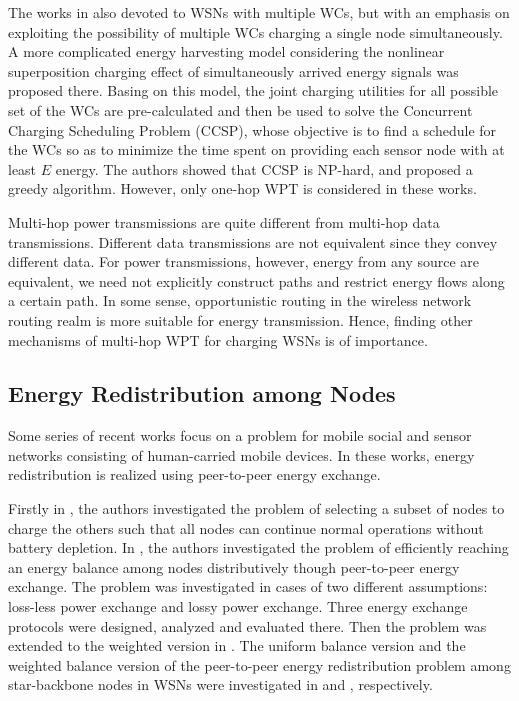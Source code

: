 \documentclass[12pt,journal,onecolumn,draftcls]{IEEEtran}
\begin{document}
The works in \cite{Guo2017,Guo2016} also devoted to WSNs with multiple WCs, but with an emphasis on exploiting the possibility of multiple WCs charging a single node simultaneously. A more complicated energy harvesting model considering the nonlinear superposition charging effect of simultaneously arrived energy signals was proposed there. Basing on this model, the joint charging utilities for all possible set of the WCs are pre-calculated and then be used to solve the Concurrent Charging Scheduling Problem (CCSP), whose objective is to find a schedule for the WCs so as to minimize the time spent on providing each sensor node with at least $E$ energy. The authors showed that CCSP is NP-hard, and proposed a greedy algorithm. However, only one-hop WPT is considered in these works.

Multi-hop power transmissions are quite different from multi-hop data transmissions. Different data transmissions are not equivalent since they convey different data. For power transmissions, however, energy from any source are equivalent, we need not explicitly construct paths and restrict energy flows along a certain path. In some sense, opportunistic routing in the wireless network routing realm is more suitable for energy transmission. Hence, finding other mechanisms of multi-hop WPT for charging WSNs is of importance.

\subsection{Energy Redistribution among Nodes}

Some series of recent works \cite{Bulut2014,Niko2016,Niko2017,Madhja2016,Madhja2017} focus on a problem for mobile social and sensor networks consisting of human-carried mobile devices. In these works, energy redistribution is realized using peer-to-peer energy exchange.

Firstly in \cite{Bulut2014}, the authors investigated the problem of selecting a subset of nodes to charge the others such that all nodes can continue normal operations without battery depletion. In \cite{Niko2016}, the authors investigated the problem of efficiently reaching an energy balance among nodes distributively though peer-to-peer energy exchange. The problem was investigated in cases of two different assumptions: loss-less power exchange and lossy power exchange. Three energy exchange protocols were designed, analyzed and evaluated there. Then the problem was extended to the weighted version in \cite{Niko2017}. The uniform balance version and the weighted balance version of the peer-to-peer energy redistribution problem among star-backbone nodes in WSNs were investigated in \cite{Madhja2016} and \cite{Madhja2017}, respectively.
\end{document}
